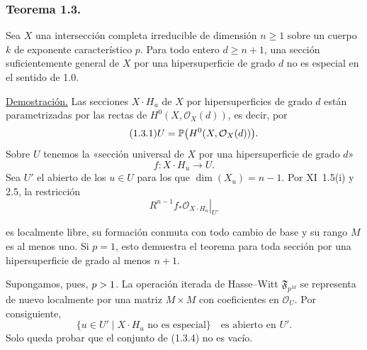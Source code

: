 \subsubsection*{Teorema 1.3.}
Sea $X$ una intersección completa irreducible de dimensión $n\geq1$ sobre
un cuerpo $k$ de exponente característico $p$. Para todo entero
$d\geq n+1$, una sección suficientemente general de $X$ por una
hipersuperficie de grado $d$ no es especial en el sentido de 1.0.

\noindent\underline{Demostración.}
Las secciones $X\mathbin{\cdot}H_u$ de $X$ por hipersuperficies de grado
$d$ están parametrizadas por las rectas de $H^0(X,\mathcal O_X(d))$, es
decir, por
\begin{equation}\tag{1.3.1}
U=\mathbb P\bigl(H^0(X,\mathcal O_X(d))\sisi{}{\bigr)}.
\end{equation}
Sobre $U$ tenemos la «sección universal de $X$ por una hipersuperficie de
grado $d$»
\begin{equation}\tag{1.3.2}
f:X\mathbin{\cdot}H_u\longrightarrow U.
\end{equation}
Sea $U'$ el abierto de los $u\in U$ para los que $\dim(X_u)=n-1$. Por
XI~1.5(i) y 2.5, la restricción
\begin{equation}\tag{1.3.3}
\left.R^{n-1}f_*\mathcal O_{X\cdot H_u}\right|_{U'}
\end{equation}

\pageoriginale

es localmente libre, su formación conmuta con todo cambio de base y su
rango $M$ es al menos uno. Si $p=1$, esto demuestra el teorema para toda
sección por una hipersuperficie de grado al menos $n+1$.

Supongamos, pues, $p>\sisi{0}{1}$. La operación iterada de Hasse--Witt
$\mathfrak F_{p^M}$ se representa de nuevo localmente por una matriz
$M\times M$ con coeficientes en $\mathcal O_U$. Por consiguiente,
\begin{equation}\tag{1.3.4}
\{u\in U'\mid X\mathbin{\cdot}H_u\text{ no es especial}\}
\quad\text{es abierto en }U'.
\end{equation}
Solo queda probar que el conjunto de (1.3.4) no es vacío.

